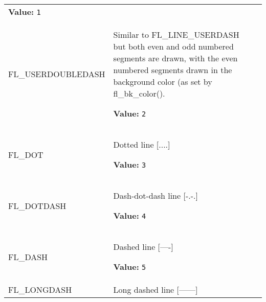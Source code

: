 \begin{longtable}{|p{\varnamewidth}|p{\vardescrwidth}|l}
\textbf{Value:} 
{\tt 1}&\\
\cline{1-2}
\raggedright F\-L\-\_\-U\-S\-E\-R\-D\-O\-U\-B\-L\-E\-D\-A\-S\-H\- & \raggedright Similar to FL\_LINE\_USERDASH but both even and odd numbered 
          segments are drawn, with the even numbered segments drawn in the 
          background color (as set by fl\_bk\_color().

\textbf{Value:} 
{\tt 2}&\\
\cline{1-2}
\raggedright F\-L\-\_\-D\-O\-T\- & \raggedright Dotted line [....]

\textbf{Value:} 
{\tt 3}&\\
\cline{1-2}
\raggedright F\-L\-\_\-D\-O\-T\-D\-A\-S\-H\- & \raggedright Dash-dot-dash line [-.-.]

\textbf{Value:} 
{\tt 4}&\\
\cline{1-2}
\raggedright F\-L\-\_\-D\-A\-S\-H\- & \raggedright Dashed line [----]

\textbf{Value:} 
{\tt 5}&\\
\cline{1-2}
\raggedright F\-L\-\_\-L\-O\-N\-G\-D\-A\-S\-H\- & \raggedright Long dashed line [------]


\end{longtable}
